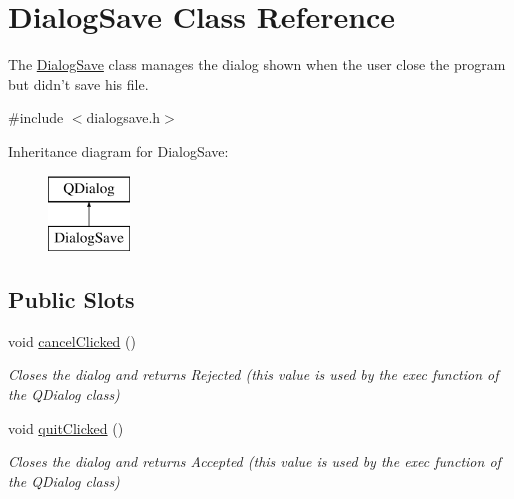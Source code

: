 \hypertarget{classDialogSave}{\section{Dialog\-Save Class Reference}
\label{classDialogSave}
}


The \hyperlink{classDialogSave}{Dialog\-Save} class manages the dialog shown when the user close the program but didn't save his file.  




{\ttfamily \#include $<$dialogsave.\-h$>$}

Inheritance diagram for Dialog\-Save\-:\begin{figure}[H]
\begin{center}
\leavevmode
\includegraphics[height=2.000000cm]{classDialogSave}
\end{center}
\end{figure}
\subsection*{Public Slots}
\begin{DoxyCompactItemize}
\item 
\hypertarget{classDialogSave_a88af0b56e780534a18edabd9136ae9be}{void \hyperlink{classDialogSave_a88af0b56e780534a18edabd9136ae9be}{cancel\-Clicked} ()}\label{classDialogSave_a88af0b56e780534a18edabd9136ae9be}

\begin{DoxyCompactList}\small\item\em Closes the dialog and returns Rejected (this value is used by the exec function of the Q\-Dialog class) \end{DoxyCompactList}\item 
\hypertarget{classDialogSave_a3cbea9dd6b3efe8acf7149ac6b401724}{void \hyperlink{classDialogSave_a3cbea9dd6b3efe8acf7149ac6b401724}{quit\-Clicked} ()}\label{classDialogSave_a3cbea9dd6b3efe8acf7149ac6b401724}

\begin{DoxyCompactList}\small\item\em Closes the dialog and returns Accepted (this value is used by the exec function of the Q\-Dialog class) \end{DoxyCompactList}\end{DoxyCompactItemize}
